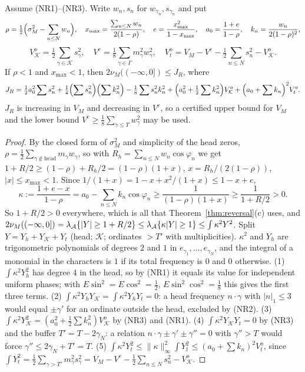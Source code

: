 \begin{theorem}\label{thm:nr}
Assume (NR1)--(NR3). Write $w_n,s_n$ for $w_{\gamma_n},s_{\gamma_n}$ and put
\[
\rho=\tfrac12\Bigl(\sigma_M^2-\sum_{n\le N}w_n\Bigr),\quad x_{\max}=\frac{\sum_{n\le N}w_n}{2(1-\rho)},\quad e=\frac{x_{\max}^2}{1-x_{\max}},\quad a_0=\frac{1+e}{1-\rho},\quad k_n=\frac{w_n}{2(1-\rho)^2},
\]
\[
V^o_{\mathcal K}=\tfrac12\sum_{\gamma\in\mathcal K}s_\gamma^2,\quad V^e=\tfrac18\sum_{\gamma\in\Gamma}m_\gamma^2w_\gamma^2,\quad V^o_t=V_M-V^e-\tfrac12\sum_{n\le N}s_n^2-V^o_{\mathcal K}.
\]
If $\rho<1$ and $x_{\max}<1$, then $2\nu_M((-\infty,0])\le J_R$, where
\[
J_R=\tfrac12a_0^2\sum s_n^2+\tfrac14\Bigl(\sum s_n^2\Bigr)\Bigl(\sum k_n^2\Bigr)-\tfrac18\sum s_n^2k_n^2+\Bigl(a_0^2+\tfrac12\sum k_n^2\Bigr)V^o_{\mathcal K}+\Bigl(a_0+\sum k_n\Bigr)^2V^o_t.
\]
$J_R$ is increasing in $V_M$ and decreasing in $V^e$, so a certified upper bound for $V_M$ and the lower bound $V^e\ge\frac18\sum_{\gamma\le T}w_\gamma^2$ may be used.
\end{theorem}

\begin{proof}
By the closed form of $\sigma_M^2$ and simplicity of the head zeros, $\rho=\frac12\sum_{\gamma\notin\text{head}}m_\gamma w_\gamma$, so with $R_h=\sum_{n\le N}w_n\cos\varphi_n$ we get $1+R/2\ge(1-\rho)+R_h/2=(1-\rho)(1+x)$, $x=R_h/(2(1-\rho))$, $|x|\le x_{\max}<1$. Since $1/(1+x)=1-x+x^2/(1+x)\le1-x+e$,
\[
\kappa:=\frac{1+e-x}{1-\rho}=a_0-\sum_{n\le N}k_n\cos\varphi_n\ge\frac1{(1-\rho)(1+x)}\ge\frac1{1+R/2}>0 .
\]
So $1+R/2>0$ everywhere, which is all that Theorem~\ref{thm:reversal}(c) uses, and $2\nu_M((-\infty,0])=\lambda_{\mathcal A}\{|Y|\ge1+R/2\}\le\lambda_{\mathcal A}\{\kappa|Y|\ge1\}\le\int\kappa^2Y^2$. Split $Y=Y_h+Y_{\mathcal K}+Y_t$ (head; $\mathcal K$; ordinates $>T'$ with multiplicities). $\kappa^2$ and $Y_h$ are trigonometric polynomials of degrees $2$ and $1$ in $e_{\gamma_1},\dots,e_{\gamma_N}$, and the integral of a monomial in the characters is $1$ if its total frequency is $0$ and $0$ otherwise. (1) $\int\kappa^2Y_h^2$ has degree $4$ in the head, so by (NR1) it equals its value for independent uniform phases; with $E\sin^2=E\cos^2=\frac12$, $E\sin^2\cos^2=\frac18$ this gives the first three terms. (2) $\int\kappa^2Y_hY_{\mathcal K}=\int\kappa^2Y_hY_t=0$: a head frequency $n\cdot\gamma$ with $|n|_1\le3$ would equal $\pm\gamma'$ for an ordinate outside the head, excluded by (NR2). (3) $\int\kappa^2Y_{\mathcal K}^2=(a_0^2+\frac12\sum k_n^2)V^o_{\mathcal K}$ by (NR3) and (NR1). (4) $\int\kappa^2Y_{\mathcal K}Y_t=0$ by (NR3) and the buffer $T'=T-2\gamma_N$: a relation $n\cdot\gamma\pm\gamma'\pm\gamma''=0$ with $\gamma''>T$ would force $\gamma''\le2\gamma_N+T'=T$. (5) $\int\kappa^2Y_t^2\le\|\kappa\|_\infty^2\int Y_t^2\le(a_0+\sum k_n)^2V^o_t$, since $\int Y_t^2=\frac12\sum_{\gamma>T'}m_\gamma^2s_\gamma^2=V_M-V^e-\frac12\sum_{n\le N}s_n^2-V^o_{\mathcal K}$.
\end{proof}

